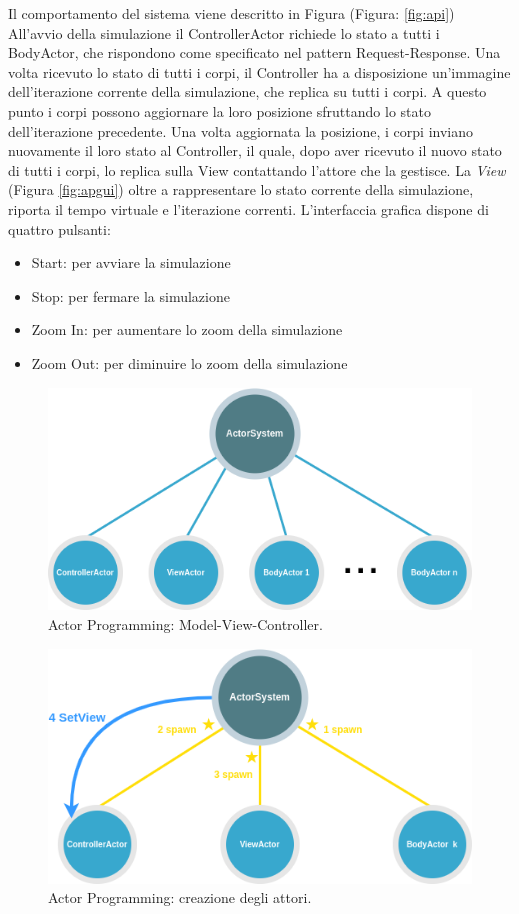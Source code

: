 \documentclass[12pt,a4paper,openright,twoside]{book}
\begin{document}
Il comportamento del sistema viene descritto in Figura (Figura: \ref{fig:api})
All'avvio della simulazione il ControllerActor richiede lo stato a tutti i BodyActor, che rispondono come specificato nel pattern Request-Response. Una volta ricevuto lo stato di tutti i corpi, il Controller ha a disposizione un'immagine dell'iterazione corrente della simulazione, che replica su tutti i corpi. A questo punto i corpi possono aggiornare la loro posizione sfruttando lo stato dell'iterazione precedente.
Una volta aggiornata la posizione, i corpi inviano nuovamente il loro stato al Controller, il quale, dopo aver ricevuto il nuovo stato di tutti i corpi, lo replica sulla View contattando l'attore che la gestisce.
La \textit{View} (Figura \ref{fig:apgui}) oltre a rappresentare lo stato corrente della simulazione, riporta il tempo virtuale e l'iterazione correnti.
L'interfaccia grafica dispone di quattro pulsanti:
\begin{itemize}
    \item Start: per avviare la simulazione
    \item Stop: per fermare la simulazione
    \item Zoom In: per aumentare lo zoom della simulazione
    \item Zoom Out: per diminuire lo zoom della simulazione
\end{itemize}
\begin{figure}[H]
	\centering
	\includegraphics[width=\textwidth]{figures/actor-programming-mvc.png}
	\caption{Actor Programming: Model-View-Controller.}
	\label{fig:apmvc}
\end{figure}
\begin{figure}[H]
	\centering
	\includegraphics[width=\textwidth]{figures/actor-programming-creation.png}
	\caption{Actor Programming: creazione degli attori.}
	\label{fig:apc}
\end{figure}
\end{document}
